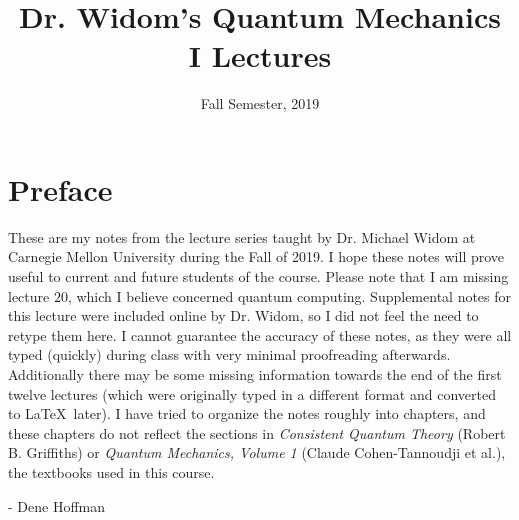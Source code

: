 \documentclass[a4paper, twoside]{report}
\title{Dr. Widom's Quantum Mechanics I Lectures}
\date{Fall Semester, 2019}
\begin{document}
    \maketitle
    \tableofcontents
    \chapter*{Preface}
    These are my notes from the lecture series taught by Dr. Michael Widom at Carnegie Mellon University during the Fall of 2019. I hope these notes will prove useful to current and future students of the course. Please note that I am missing lecture $ 20 $, which I believe concerned quantum computing. Supplemental notes for this lecture were included online by Dr. Widom, so I did not feel the need to retype them here. I cannot guarantee the accuracy of these notes, as they were all typed (quickly) during class with very minimal proofreading afterwards. Additionally there may be some missing information towards the end of the first twelve lectures (which were originally typed in a different format and converted to \LaTeX\ later). I have tried to organize the notes roughly into chapters, and these chapters do not reflect the sections in \textit{Consistent Quantum Theory} (Robert B. Griffiths) or \textit{Quantum Mechanics, Volume 1} (Claude Cohen-Tannoudji et al.), the textbooks used in this course.

        - Dene Hoffman

    
    
    
    
    
    
    
    

    
    
    
    
    
    
    
    
    
    
    
    
    
    
    
    
    
    
    
    
    
    
    
    
    
\end{document}
